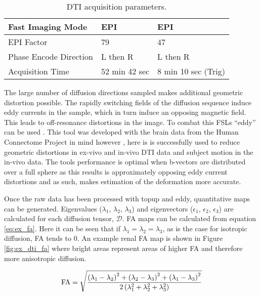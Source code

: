 \begin{table}[H]
\begin{tabularx}{1.0\textwidth}{|X|X|X|}
		Fast Imaging Mode                  & EPI             & EPI                 \\ \hline
		EPI Factor                         & 79              & 47                  \\ \hline
		Phase Encode Direction             & L then R        & L then R            \\ \hline
		Acquisition Time                   & 52 min 42 sec   & 8 min 10 sec (Trig) \\ \hline
	\end{tabularx}
	\caption{\ac{DTI} acquisition parameters.}
	\label{tab:ex_dti_mapping}
\end{table}

The large number of diffusion directions sampled makes additional geometric distortion possible. The rapidly switching fields of the diffusion sequence induce eddy currents in the sample, which in turn induce an opposing magnetic field. This leads to off-resonance distortions in the image. To combat this \ac{FSL}s ``eddy'' can be used \cite{andersson_integrated_2016}. This tool was developed with the brain data from the Human Connectome Project in mind however \cite{andersson_non-parametric_2015}, here is is successfully used to reduce geometric distortions in ex-vivo and in-vivo \ac{DTI} data and subject motion in the in-vivo data. The tools performance is optimal when b-vectors are distributed over a full sphere as this results is approximately opposing eddy current distortions and as such, makes estimation of the deformation more accurate.

Once the raw data has been processed with topup and eddy, quantitative maps can be generated. Eigenvalues ($\lambda_1$, $\lambda_2$, $\lambda_3$) and eigenvectors ($\epsilon_1$, $\epsilon_2$, $\epsilon_3$) are calculated for each diffusion tensor, $\mathscr{D}$. \ac{FA} maps can be calculated from equation \eqref{eq:ex_fa}. Here it can be seen that if $\lambda_1 = \lambda_2 = \lambda_3$, as is the case for isotropic diffusion, \ac{FA} tends to 0. An example renal \ac{FA} map is shown in Figure \ref{fig:ex_dti_fa} where bright areas represent areas of higher \ac{FA} and therefore more anisotropic diffusion.

\begin{equation}
	\textup{FA} = \sqrt{\frac{\left(\lambda_1 - \lambda_2\right)^2 + \left(\lambda_2 - \lambda_3\right)^2 + \left(\lambda_1 - \lambda_3\right)^2}{2\left( \lambda_1^2 + \lambda_2^2 + \lambda_3^2\right)}}
		\label{eq:ex_fa}
\end{equation}

